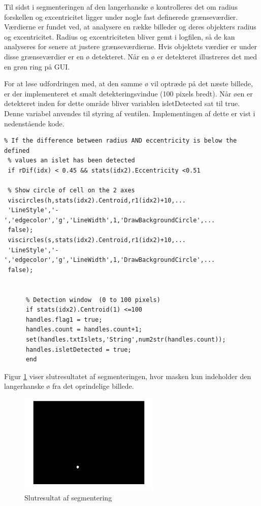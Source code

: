 \newpage
Til sidst i segmenteringen af den langerhanske ø kontrolleres det om radius forskellen og excentricitet ligger under nogle fast definerede grænseværdier. Værdierne er fundet ved, at analysere en række billeder og deres objekters radius og excentricitet. Radius og excentriciteten bliver gemt i logfilen, så de kan analyseres for senere at justere grænseværdierne. Hvis objektets værdier er under disse grænseværdier er en ø detekteret. Når en ø er detekteret illustreres det med en grøn ring på GUI.

For at løse udfordringen med, at den samme ø vil optræde på det næste billede, er der implementeret et smalt detekteringsvindue (100 pixels bredt). Når øen er detekteret inden for dette område bliver variablen isletDetected sat til true. Denne variabel anvendes til styring af ventilen. Implementingen af dette er vist i nedenstående kode.


\begin{lstlisting} 
% If the difference between radius AND eccentricity is below the defined
 % values an islet has been detected
 if rDif(idx) < 0.45 && stats(idx2).Eccentricity <0.51
     
 % Show circle of cell on the 2 axes
 viscircles(h,stats(idx2).Centroid,r1(idx2)+10,...
 'LineStyle','-','edgecolor','g','LineWidth',1,'DrawBackgroundCircle',...
 false);
 viscircles(s,stats(idx2).Centroid,r1(idx2)+10,...
 'LineStyle','-','edgecolor','g','LineWidth',1,'DrawBackgroundCircle',...
 false);

     
      % Detection window  (0 to 100 pixels)
      if stats(idx2).Centroid(1) <=100 
      handles.flag1 = true;
      handles.count = handles.count+1; 
      set(handles.txtIslets,'String',num2str(handles.count));
      handles.isletDetected = true;
      end
\end{lstlisting} 

Figur \ref{fig:segmented} viser slutresultatet af segmenteringen, hvor masken kun indeholder den langerhanske ø fra det oprindelige billede. 


\begin{figure}[H]
	\centering
	\includegraphics[width=0.6\textwidth]{billeder/software/segmented.png}
	\caption{Slutresultat af segmentering}
	\label{fig:segmented}
\end{figure}

